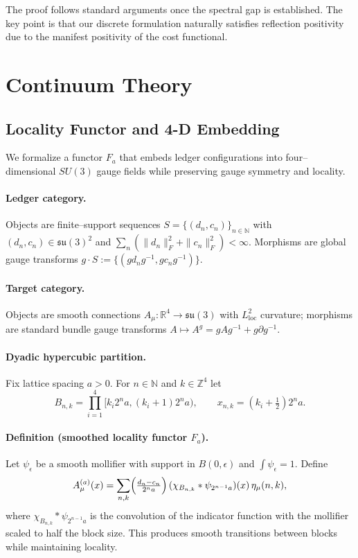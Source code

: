 \documentclass[11pt]{article}
\numberwithin{equation}{section}
\theoremstyle{definition}
\theoremstyle{remark}
\begin{document}
The proof follows standard arguments once the spectral gap is established. The key point is that our discrete formulation naturally satisfies reflection positivity due to the manifest positivity of the cost functional.

\section{Continuum Theory}

\subsection{Locality Functor and 4-D Embedding}
\label{sec:locality-functor}

We formalize a functor $F_a$ that embeds ledger configurations into four--dimensional $SU(3)$ gauge fields while preserving gauge symmetry and locality.

\paragraph{Ledger category.} Objects are finite--support sequences $S=\{(d_n,c_n)\}_{n\in\mathbb N}$ with $(d_n,c_n)\in\mathfrak{su}(3)^2$ and $\sum_n(\|d_n\|_F^2+\|c_n\|_F^2)<\infty$. Morphisms are global gauge transforms $g\cdot S:=\{(g d_n g^{-1},g c_n g^{-1})\}$.

\paragraph{Target category.} Objects are smooth connections $A_\mu: \mathbb R^4\to\mathfrak{su}(3)$ with $L^2_{\text{loc}}$ curvature; morphisms are standard bundle gauge transforms $A\mapsto A^g=gAg^{-1}+g\partial g^{-1}$.

\paragraph{Dyadic hypercubic partition.} Fix lattice spacing $a>0$. For $n\in\mathbb N$ and $k\in\mathbb Z^4$ let
\[
B_{n,k}=\prod_{i=1}^{4}[k_i2^na,(k_i+1)2^na), \qquad x_{n,k}=(k_i+\tfrac12)2^na.
\]

\paragraph{Definition (smoothed locality functor $F_a$).} Let $\psi_\epsilon$ be a smooth mollifier with support in $B(0,\epsilon)$ and $\int \psi_\epsilon = 1$. Define
\[
A^{(a)}_\mu(x)=\sum_{n,k}\Bigl(\tfrac{d_n-c_n}{2^n a}\Bigr)\,(\chi_{B_{n,k}} * \psi_{2^{n-1}a})(x)\,\eta_{\mu}(n,k),
\]
where $\chi_{B_{n,k}} * \psi_{2^{n-1}a}$ is the convolution of the indicator function with the mollifier scaled to half the block size. This produces smooth transitions between blocks while maintaining locality.
\end{document}
